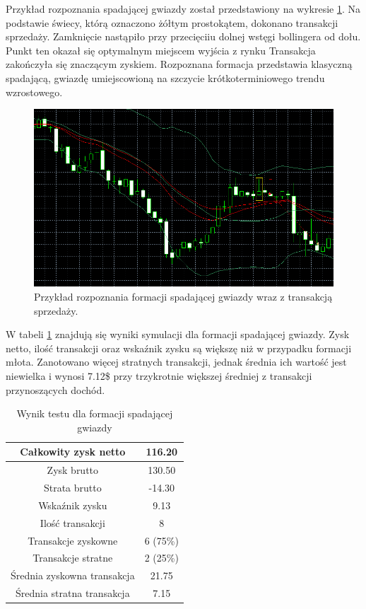 \documentclass[pdflatex,11pt]{aghdpl}
\begin{document}
Przykład rozpoznania spadającej gwiazdy został przedstawiony na wykresie \ref{przyklad_gwiazda}. Na podstawie świecy, którą oznaczono żółtym prostokątem, dokonano transakcji sprzedaży. Zamknięcie nastąpiło przy przecięciiu dolnej wstęgi bollingera od dołu. Punkt ten okazał się optymalnym miejscem wyjścia z rynku Transakcja zakończyła się znaczącym zyskiem. Rozpoznana formacja przedstawia klasyczną spadającą, gwiazdę umiejscowioną na szczycie krótkoterminiowego trendu wzrostowego.
\begin{figure}[h!]
\begin{center}
\includegraphics[width=14cm]{shootingstar/przyklad.png}
\caption{Przykład rozpoznania formacji spadającej gwiazdy wraz z transakcją sprzedaży.}
\label{przyklad_gwiazda}
\end{center}
\end{figure} 
W tabeli \ref{raport_gwiazda} znajdują się wyniki symulacji dla formacji spadającej gwiazdy. Zysk netto, ilość transakcji oraz wskaźnik zysku są większę niż w przypadku formacji młota. Zanotowano więcej stratnych transakcji, jednak średnia ich wartość jest niewielka i wynosi 7.12\$ przy trzykrotnie większej średniej z transakcji przynoszących dochód.  
\begin{table}[h!]
\begin{center}
\begin{tabular}{|c|c|}
\hline 
Całkowity zysk netto & 116.20\\
\hline
Zysk brutto & 130.50 \\
\hline
Strata brutto & -14.30 \\
\hline
Wskaźnik zysku & 9.13 \\
\hline
\hline
Ilość transakcji & 8 \\
\hline
Transakcje zyskowne & 6 (75\%) \\
\hline
Transakcje stratne & 2 (25\%) \\
\hline
\hline
Średnia zyskowna transakcja & 21.75 \\
\hline
Średnia stratna transakcja & 7.15 \\
\hline
\end{tabular} 
\caption{Wynik testu dla formacji spadającej gwiazdy}
\label{raport_gwiazda}
\end{center}
\end{table}
\end{document}
